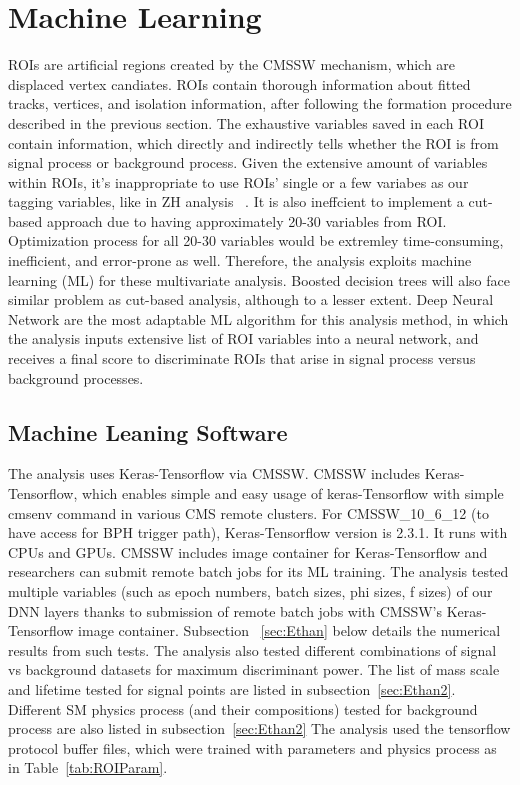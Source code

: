 \clearpage
\chapter{Machine Learning}\label{sec:machinelearning}

ROIs are artificial regions created by the CMSSW mechanism, which are displaced vertex candiates.
ROIs contain thorough information about fitted tracks, vertices, and isolation information, after following the formation procedure described in the previous section. 
The exhaustive variables saved in each ROI contain information, which directly and indirectly tells whether the ROI is from signal process or background process.
Given the extensive amount of variables within ROIs, it's inappropriate to use ROIs' single or a few variabes as our tagging variables, like in ZH analysis ~\cite{ZHAN}.  
It is also ineffcient to implement a cut-based approach due to having approximately 20-30 variables from ROI.
Optimization process for all 20-30 variables would be extremley time-consuming, inefficient, and error-prone as well.
Therefore, the analysis exploits machine learning (ML) for these multivariate analysis.
Boosted decision trees will also face similar problem as cut-based analysis, although to a lesser extent.
Deep Neural Network are the most adaptable ML algorithm for this analysis method, in which the analysis inputs extensive list of ROI variables into a neural network, and receives a final score to discriminate ROIs that arise in signal process versus background processes. 

  
\section{Machine Leaning Software}\label{sec:MLSW}

The analysis uses Keras-Tensorflow via CMSSW.
CMSSW includes Keras-Tensorflow, which enables simple and easy usage of keras-Tensorflow with simple cmsenv command in various CMS remote clusters. 
For CMSSW\_10\_6\_12 (to have access for BPH trigger path), Keras-Tensorflow version is 2.3.1.
It runs with CPUs and GPUs.
CMSSW includes image container for Keras-Tensorflow and researchers can submit remote batch jobs for its ML training.
The analysis tested multiple variables (such as epoch numbers, batch sizes, phi sizes, f sizes) of our DNN layers thanks to submission of remote batch jobs with CMSSW's Keras-Tensorflow image container.
Subsection ~\ref{sec:Ethan} below details the numerical results from such tests.
The analysis also tested different combinations of signal vs background datasets for maximum discriminant power. 
The list of mass scale and lifetime tested for signal points are listed in subsection~\ref{sec:Ethan2}. Different SM physics process (and their compositions) tested for background process are also listed in subsection~\ref{sec:Ethan2}
The analysis used the tensorflow protocol buffer files, which were trained with parameters and physics process as in Table~\ref{tab:ROIParam}. 


